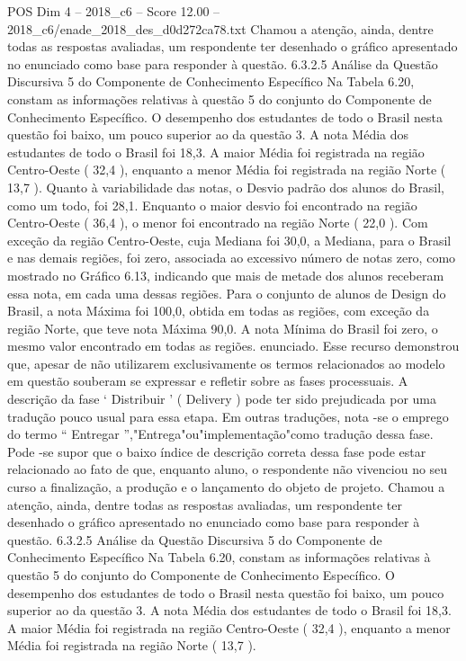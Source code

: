 \begin{textsample}{POS Dim 4 – 2018\_c6 – Score 12.00 – 2018\_c6/enade\_2018\_des\_d0d272ca78.txt}
Chamou a atenção, ainda, dentre todas as respostas avaliadas, um respondente ter desenhado o gráfico apresentado no enunciado como base para responder à questão. 6.3.2.5 Análise da Questão Discursiva 5 do Componente de Conhecimento Específico Na Tabela 6.20, constam as informações relativas à questão 5 do conjunto do Componente de Conhecimento Específico.
O desempenho dos estudantes de todo o Brasil nesta questão foi baixo, um pouco superior ao da questão 3.
A nota Média dos estudantes de todo o Brasil foi 18,3.
A maior Média foi registrada na região Centro-Oeste ( 32,4 ), enquanto a menor Média foi registrada na região Norte ( 13,7 ).
Quanto à variabilidade das notas, o Desvio padrão dos alunos do Brasil, como um todo, foi 28,1.
Enquanto o maior desvio foi encontrado na região Centro-Oeste ( 36,4 ), o menor foi encontrado na região Norte ( 22,0 ).
Com exceção da região Centro-Oeste, cuja Mediana foi 30,0, a Mediana, para o Brasil e nas demais regiões, foi zero, associada ao excessivo número de notas zero, como mostrado no Gráfico 6.13, indicando que mais de metade dos alunos receberam essa nota, em cada uma dessas regiões.
Para o conjunto de alunos de Design do Brasil, a nota Máxima foi 100,0, obtida em todas as regiões, com exceção da região Norte, que teve nota Máxima 90,0.
A nota Mínima do Brasil foi zero, o mesmo valor encontrado em todas as regiões. enunciado.
Esse recurso demonstrou que, apesar de não utilizarem exclusivamente os termos relacionados ao modelo em questão souberam se expressar e refletir sobre as fases processuais.
A descrição da fase ‘ Distribuir ’ ( Delivery ) pode ter sido prejudicada por uma tradução pouco usual para essa etapa.
Em outras traduções, nota -se o emprego do termo “ Entregar ”,"Entrega"ou"implementação"como tradução dessa fase.
Pode -se supor que o baixo índice de descrição correta dessa fase pode estar relacionado ao fato de que, enquanto aluno, o respondente não vivenciou no seu curso a finalização, a produção e o lançamento do objeto de projeto.
Chamou a atenção, ainda, dentre todas as respostas avaliadas, um respondente ter desenhado o gráfico apresentado no enunciado como base para responder à questão. 6.3.2.5 Análise da Questão Discursiva 5 do Componente de Conhecimento Específico Na Tabela 6.20, constam as informações relativas à questão 5 do conjunto do Componente de Conhecimento Específico.
O desempenho dos estudantes de todo o Brasil nesta questão foi baixo, um pouco superior ao da questão 3.
A nota Média dos estudantes de todo o Brasil foi 18,3.
A maior Média foi registrada na região Centro-Oeste ( 32,4 ), enquanto a menor Média foi registrada na região Norte ( 13,7 ).

\end{textsample}
